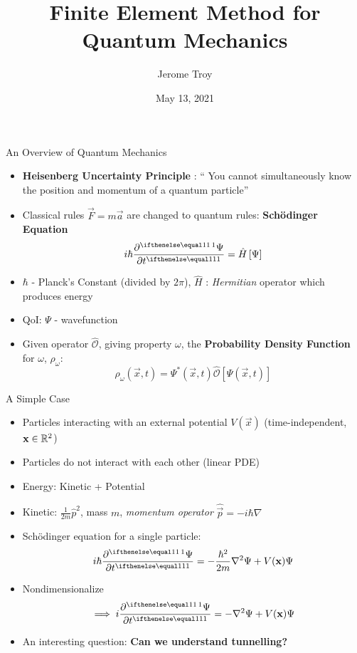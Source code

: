\documentclass{beamer}
\title[FEM for Quantum]{
		Finite Element Method for Quantum Mechanics
}
\author[J. Troy]{Jerome Troy}
\date{May 13, 2021}
\begin{document}
\begin{frame}
		\titlepage
\end{frame}

\begin{frame}{An Overview of Quantum Mechanics}
  \begin{itemize}
  	\item \textbf{Heisenberg Uncertainty Principle} : ``
			You cannot simultaneously know the position and 
			momentum of a quantum particle''
	\item Classical rules $\vec F = m \vec a$ are changed to
			quantum rules: \textbf{Sch\"odinger Equation}
			\[
					i \hbar \pder{\Psi}{t} = \hat H\left[\Psi\right]
			\] 
	\item $\hbar$ - Planck's Constant (divided by $2\pi$), 
			$\hat H$ : \textit{Hermitian} operator which produces energy
	\item QoI: $\Psi$ - wavefunction
	\item Given operator $\hat{\mathcal O}$, giving property $\omega$, 
			the \textbf{Probability Density Function} for $\omega$,
			$\rho_\omega$:
			\[
					\rho_\omega(\vec x, t) = \Psi^*(\vec x, t) 
					\hat{\mathcal O}\left[\Psi(\vec x, t)\right] 
			\] 
  \end{itemize}
\end{frame}

\begin{frame}{A Simple Case}
  \begin{itemize}
  	\item Particles interacting with an external potential 
			$V(\vec x)$ (time-independent, $\mathbf{x} \in \mathbb{R}^2$)
	\item Particles do not interact with each other (linear PDE)
	\item Energy: Kinetic + Potential
	\item Kinetic: $\frac{1}{2m} \hat p^2$, mass $m$, 
			\textit{momentum operator} $\hat{\vec p} = -i \hbar \nabla$
	\item Sch\"odinger equation for a single particle:
			\[
					i \hbar \pder{\Psi}{t} = 
					-\frac{\hbar^2}{2m} \nabla^2 \Psi + V(\vec x) \Psi
			\]
	\item Nondimensionalize 
			\[
					\implies i \pder{\Psi}{t} = 
					-\nabla^2 \Psi + V(\vec x) \Psi
			\] 
	\item An interesting question: \textbf{Can we understand tunnelling?}
  \end{itemize}
\end{frame}
\end{document}
